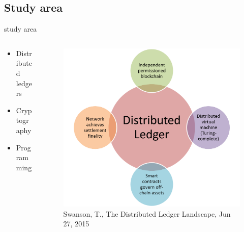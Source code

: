 \documentclass[xcolor=x11names,compress]{beamer}
\renewcommand{\(}{\begin{columns}}
\renewcommand{\)}{\end{columns}}
\newcommand{\<}[1]{\begin{column}{#1}}
\renewcommand{\>}{\end{column}}
\begin{document}
\subsection{Study area}
\begin{frame}{study area}
    \(
        \begin{column}{0.5\textwidth}
    \begin{itemize}
        \item Distributed ledgers
        \item Cryptography
       \item \small Programming
    \end{itemize}
    \end{column}
        \begin{column}{0.5\textwidth}
            \begin{figure}
                \includegraphics[scale=0.35]{./images/dlt}
                \caption{\tiny Swanson, T., The Distributed Ledger Landscape, Jun 27, 2015}
            \end{figure}
        \end{column}
    \)
\end{frame}
\end{document}
